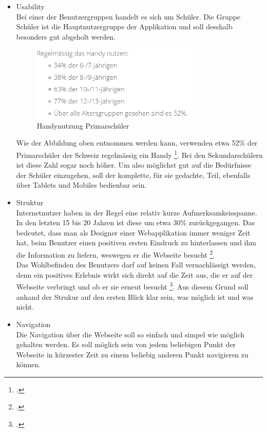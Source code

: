 \begin{itemize}
	\item Usability \\
		Bei einer der Benutzergruppen handelt es sich um Schüler. Die Gruppe Schüler ist die Hauptnutzergruppe der Applikation und soll desshalb besonders gut abgeholt werden. \\
		
\begin{minipage}{\textwidth}
	\begin{figure}[H]
	\centering
		\includegraphics[width=8cm, keepaspectratio]{images/HandyNutzung.png}
		\caption{Handynutzung Primarschüler}
	\end{figure}
\end{minipage}
		
		Wie der Abbildung oben entnommen werden kann, verwenden etwa 52\% der Primarschüler der Schweiz regelmässig ein Handy \footcite{smartphone_usage}. Bei den Sekundarschülern ist diese Zahl sogar noch höher. Um also möglichst gut auf die Bedürfnisse der Schüler einzugehen, soll der komplette, für sie gedachte, Teil, ebenfalls über Tablets und Mobiles bedienbar sein.
		
	\item Struktur \\
		Internetnutzer haben in der Regel eine relativ kurze Aufmerksamkeisspanne. In den letzten 15 bis 20 Jahren ist diese um etwa 30\% zurückgegangen. Das bedeutet, dass man als Designer einer Webapplikation immer weniger Zeit hat, beim Benutzer einen positiven ersten Eindruck zu hinterlassen und ihm die Information zu liefern, weswegen er die Webseite besucht \footcite{attention_span}. \\ 
		Das Wohlbefinden des Benutzers darf auf keinen Fall vernachlässigt werden, denn ein positives Erlebnis wirkt sich direkt auf die Zeit aus, die er auf der Webseite verbringt und ob er sie erneut besucht \footcite{positiv_experience}.
		Aus diesem Grund soll anhand der Strukur auf den ersten Blick klar sein, was möglich ist und was nicht.
		
	\item Navigation \\
		Die Navigation über die Webseite soll so einfach und simpel wie möglich gehalten werden. Es soll möglich sein von jedem beliebigen Punkt der Webseite in kürzester Zeit zu einem beliebig anderen Punkt navigieren zu können.
	

\end{itemize}
